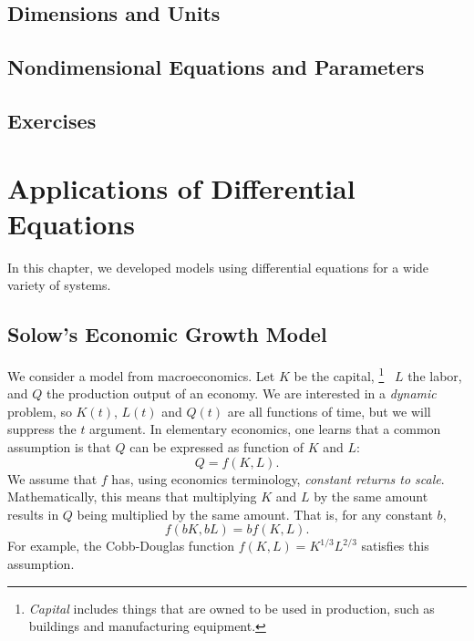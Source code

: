 \documentclass{book}
\begin{document}
\section{Dimensions and Units}
\section{Nondimensional Equations and Parameters}
\section{Exercises}
%
%
%

\chapter{Applications of Differential Equations}
%
In this chapter, we developed models using differential
equations for a wide variety of systems.
%
\section{Solow's Economic Growth Model}
We consider a model from macroeconomics.
Let $K$ be the capital,%
\footnote{\emph{Capital} includes things that are owned to be used
in production, such as buildings and manufacturing equipment.}%
~$L$ the labor, and $Q$ the production output of an economy.
We are interested in a \emph{dynamic} problem, so $K(t)$, $L(t)$ and
$Q(t)$ are all functions of time, but we will suppress the $t$ argument.
In elementary economics, one learns that a common assumption is that
$Q$ can be expressed as function of $K$ and $L$:
\begin{equation}
   Q = f(K,L).
   \label{EQN:PROD}
\end{equation}
We assume that $f$ has, using economics terminology,
\emph{constant returns to scale}.  Mathematically, this means
that multiplying $K$ and $L$ by the same amount results in $Q$ being
multiplied by the same amount.  That is, for any constant $b$,
\[
   f(bK,bL) = bf(K,L).
\]
For example, the Cobb-Douglas function
$f(K,L) = K^{1/3}L^{2/3}$
satisfies this assumption. 
\end{document}
